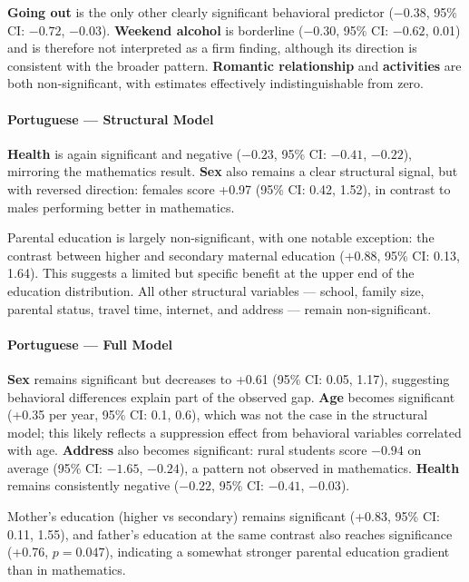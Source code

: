 \documentclass{article}
\begin{document}
\vspace{0.2em}
\textbf{Going out} is the only other clearly significant behavioral predictor ($-0.38$, 95\% CI: $-0.72$, $-0.03$). \textbf{Weekend alcohol} is borderline ($-0.30$, 95\% CI: $-0.62$, 0.01) and is therefore not interpreted as a firm finding, although its direction is consistent with the broader pattern. \textbf{Romantic relationship} and \textbf{activities} are both non-significant, with estimates effectively indistinguishable from zero.


\paragraph{Portuguese --- Structural Model}

\textbf{Health} is again significant and negative ($-0.23$, 95\% CI: $-0.41$, $-0.22$), mirroring the mathematics result. \textbf{Sex} also remains a clear structural signal, but with reversed direction: females score +0.97 (95\% CI: 0.42, 1.52), in contrast to males performing better in mathematics.

\vspace{0.2em}
Parental education is largely non-significant, with one notable exception: the contrast between higher and secondary maternal education (+0.88, 95\% CI: 0.13, 1.64). This suggests a limited but specific benefit at the upper end of the education distribution. All other structural variables --- school, family size, parental status, travel time, internet, and address --- remain non-significant.


\paragraph{Portuguese --- Full Model}

\textbf{Sex} remains significant but decreases to +0.61 (95\% CI: 0.05, 1.17), suggesting behavioral differences explain part of the observed gap. \textbf{Age} becomes significant (+0.35 per year, 95\% CI: 0.1, 0.6), which was not the case in the structural model; this likely reflects a suppression effect from behavioral variables correlated with age. \textbf{Address} also becomes significant: rural students score $-0.94$ on average (95\% CI: $-1.65$, $-0.24$), a pattern not observed in mathematics. \textbf{Health} remains consistently negative ($-0.22$, 95\% CI: $-0.41$, $-0.03$).

\vspace{0.2em}
Mother’s education (higher vs secondary) remains significant (+0.83, 95\% CI: 0.11, 1.55), and father’s education at the same contrast also reaches significance (+0.76, $p = 0.047$), indicating a somewhat stronger parental education gradient than in mathematics.
\end{document}
